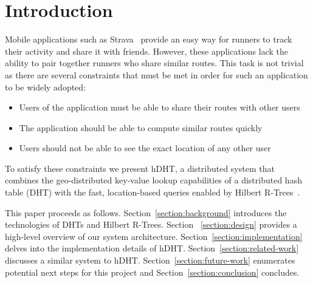 \section{Introduction}
Mobile applications such as Strava~\cite{strava} provide an easy way for runners to track their activity and share it with friends. However, these applications lack the ability to pair together runners who share similar routes. This task is not trivial as there are several constraints that must be met in order for such an application to be widely adopted:
\begin{itemize}
	\item Users of the application must be able to share their routes with other users
	\item The application should be able to compute similar routes quickly
	\item Users should not be able to see the exact location of any other user
\end{itemize}

To satisfy these constraints we present hDHT, a distributed system that combines the geo-distributed key-value lookup capabilities of a distributed hash table (DHT) with the fast, location-based queries enabled by Hilbert R-Trees~\cite{kamel1993hilbert}.


This paper proceeds as follows. Section~\ref{section:background} introduces the technologies of DHTs and Hilbert R-Trees. Section ~\ref{section:design} provides a high-level overview of our system architecture. Section~\ref{section:implementation} delves into the implementation details of hDHT. Section~\ref{section:related-work} discusses a similar system to hDHT. Section~\ref{section:future-work} enumerates potential next steps for this project and Section~\ref{section:conclusion} concludes.